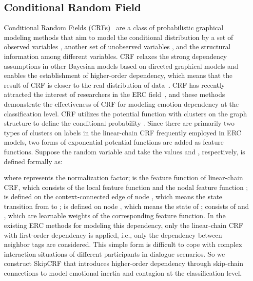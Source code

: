 \documentclass{SCIS2019}
\begin{document}
\subsection{Conditional Random Field}
Conditional Random Fields (CRFs)~\cite{lafferty2001,MAL-013} are a class of probabilistic graphical modeling methods that aim to model the conditional distribution  by a set of observed variables , another set of unobserved variables , and the structural information among different variables. CRF relaxes the strong dependency assumptions in other Bayesian models based on directed graphical models and enables the establishment of higher-order dependency, which means that the result of CRF is closer to the real distribution of data~\cite{Li2022AComprehensiveReview}. CRF has recently attracted the interest of researchers in the ERC field~\cite{wang2020contextualized, song2022emotionflow, liang2021s+}, and these methods demonstrate the effectiveness of CRF for modeling emotion dependency at the classification level. CRF utilizes the potential function with clusters on the graph structure to define the conditional probability . Since there are primarily two types of clusters on labels in the linear-chain CRF frequently employed in ERC models, two forms of exponential potential functions are added as feature functions. Suppose the random variable  and  take the values  and , respectively,  is defined formally as:

where  represents the normalization factor;  is the feature function of linear-chain CRF, which consists of the local feature function  and the nodal feature function ;  is defined on the context-connected edge of node , which means the state transition from  to ;  is defined on node , which means the state of ;  consists of  and , which are learnable weights of the corresponding feature function. In the existing ERC methods for modeling this dependency, only the linear-chain CRF with first-order dependency is applied, i.e., only the dependency between neighbor tags are considered. This simple form is difficult to cope with complex interaction situations of different participants in dialogue scenarios. So we construct SkipCRF that introduces higher-order dependency through skip-chain connections to model emotional inertia and contagion at the classification level.
\end{document}
